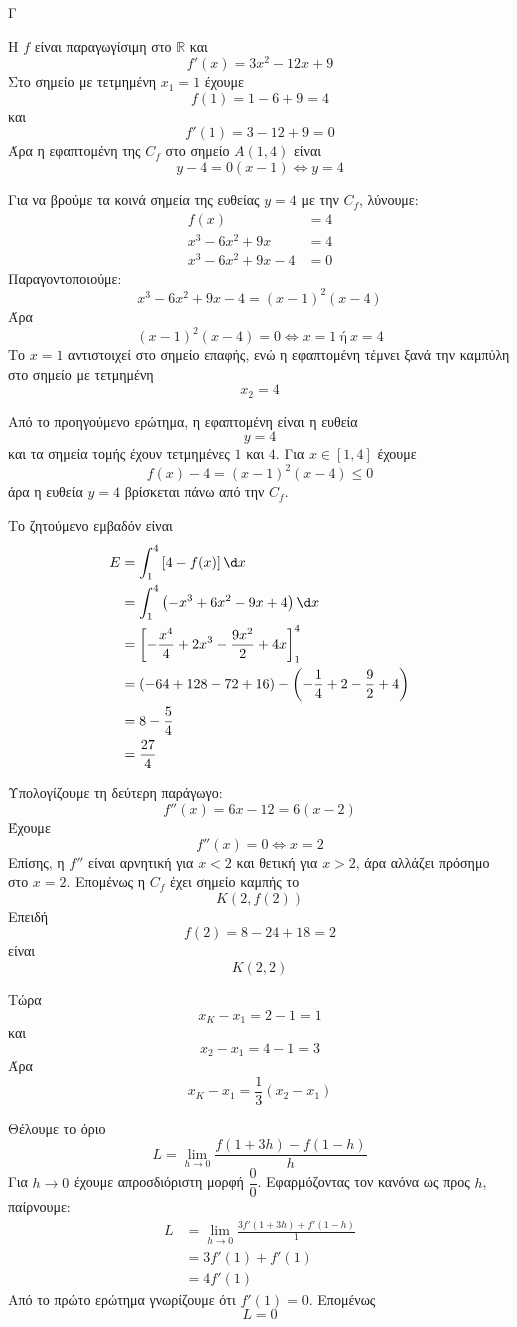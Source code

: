 \begin{thema}{Γ}
\begin{erwthma}
\item Η $f$ είναι παραγωγίσιμη στο $\mathbb{R}$ και
\[
f'(x)=3x^2-12x+9
\]
Στο σημείο με τετμημένη $x_1=1$ έχουμε
\[
f(1)=1-6+9=4
\]
και
\[
f'(1)=3-12+9=0
\]
Άρα η εφαπτομένη της $C_f$ στο σημείο $A(1,4)$ είναι
\[
y-4=0(x-1)\Leftrightarrow y=4
\]

Για να βρούμε τα κοινά σημεία της ευθείας $y=4$ με την $C_f$, λύνουμε:
\begin{align*}
f(x)&=4\\
x^3-6x^2+9x&=4\\
x^3-6x^2+9x-4&=0
\end{align*}
Παραγοντοποιούμε:
\[
x^3-6x^2+9x-4=(x-1)^2(x-4)
\]
Άρα
\[
(x-1)^2(x-4)=0\Leftrightarrow x=1 \ \text{ή}\ x=4
\]
Το $x=1$ αντιστοιχεί στο σημείο επαφής, ενώ η εφαπτομένη τέμνει ξανά την καμπύλη στο σημείο με τετμημένη
\[
x_2=4
\]

\item Από το προηγούμενο ερώτημα, η εφαπτομένη είναι η ευθεία
\[
y=4
\]
και τα σημεία τομής έχουν τετμημένες $1$ και $4$.
Για $x\in[1,4]$ έχουμε
\[
f(x)-4=(x-1)^2(x-4)\leq 0
\]
άρα η ευθεία $y=4$ βρίσκεται πάνω από την $C_f$.

Το ζητούμενο εμβαδόν είναι
\begin{align*}
E&=\dint_1^4\left[4-f(x)\right]\d x\\
&=\dint_1^4\left(-x^3+6x^2-9x+4\right)\d x\\
&=\left[-\frac{x^4}{4}+2x^3-\frac{9x^2}{2}+4x\right]_1^4\\
&=\left(-64+128-72+16\right)
-\left(-\frac{1}{4}+2-\frac{9}{2}+4\right)\\
&=8-\frac{5}{4}\\
&=\frac{27}{4}
\end{align*}

\item Υπολογίζουμε τη δεύτερη παράγωγο:
\[
f''(x)=6x-12=6(x-2)
\]
Έχουμε
\[
f''(x)=0\Leftrightarrow x=2
\]
Επίσης, η $f''$ είναι αρνητική για $x<2$ και θετική για $x>2$, άρα αλλάζει πρόσημο στο $x=2$.
Επομένως η $C_f$ έχει σημείο καμπής το
\[
K(2,f(2))
\]
Επειδή
\[
f(2)=8-24+18=2
\]
είναι
\[
K(2,2)
\]

Τώρα
\[
x_K-x_1=2-1=1
\]
και
\[
x_2-x_1=4-1=3
\]
Άρα
\[
x_K-x_1=\frac{1}{3}(x_2-x_1)
\]

\item Θέλουμε το όριο
\[
L=\lim\limits_{h\to 0}\frac{f(1+3h)-f(1-h)}{h}
\]
Για $h\to 0$ έχουμε απροσδιόριστη μορφή $\dfrac{0}{0}$.
Εφαρμόζοντας τον κανόνα  ως προς $h$, παίρνουμε:
\begin{align*}
L
&=\lim\limits_{h\to 0}\frac{3f'(1+3h)+f'(1-h)}{1}\\
&=3f'(1)+f'(1)\\
&=4f'(1)
\end{align*}
Από το πρώτο ερώτημα γνωρίζουμε ότι $f'(1)=0$.
Επομένως
\[
L=0
\]
\end{erwthma}
\end{thema}

